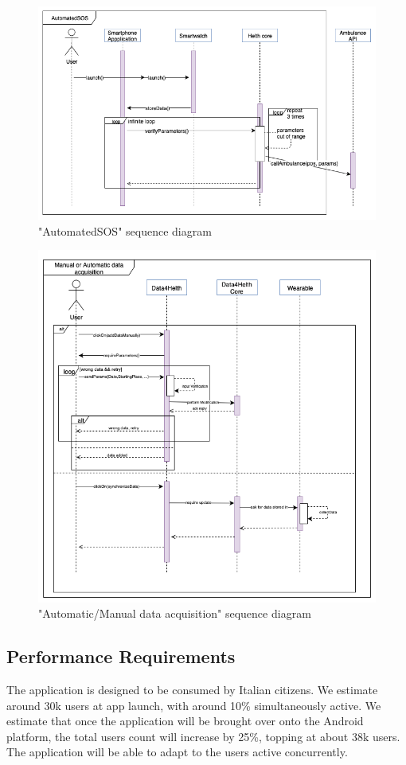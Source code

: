 \documentclass{article}
\begin{document}
\begin{figure}[h!]
  \includegraphics[width=\textwidth]{Figures/Sequence-AtomatedSOS}
  \caption{"AutomatedSOS" sequence diagram}
\end{figure}
\newpage
\begin{figure}[h!]
  \includegraphics[width=\textwidth]{Figures/Sequence-Data}
  \caption{"Automatic/Manual data acquisition" sequence diagram}
\end{figure}
\newpage


\subsection{Performance Requirements}
	The application is designed to be consumed by Italian citizens. 
	We estimate around 30k users at app launch, with around 10\% 
	simultaneously active.
	We estimate that once the application will be brought over onto
	the Android platform, the total users count will increase by 25\%,
	topping at about 38k users.
	The application will be able to adapt to the users active 
	concurrently.
\end{document}
